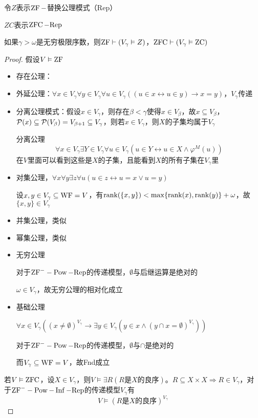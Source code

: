 \documentclass[11pt]{article}
\def \Rep {\text{Rep}}
\def \ZC {\text{ZC}}
\begin{document}
令\(Z\)表示\(\operatorname{ZF}-\)替换公理模式（Rep）

\(ZC\)表示\(\ZFC-\Rep\)

\begin{theorem}[]
如果\(\gamma>\omega\)是无穷极限序数，则\(\operatorname{ZF}\vdash(V_\gamma\vDash Z)\)，\(\ZFC\vdash(V_\gamma\vDash\ZC)\)
\end{theorem}

\begin{proof}
假设\(V\vDash\operatorname{ZF}\)
\begin{itemize}
\item 存在公理：
\item 外延公理：\(\forall x\in V_\gamma\forall y\in V_\gamma\forall u\in V_\gamma((u\in x\leftrightarrow u\in y)\to x=y)\)，\(V_\gamma\)传递
\item 分离公理模式：假设\(x\in V_\gamma\)，则存在\(\beta<\gamma\)使得\(x\in V_\beta\)，故\(x\subseteq V_\beta\)，
\(\mathcal{P}(x)\subseteq\mathcal{P}(V_\beta)=V_{\beta+1}\subseteq V_\gamma\)，则若\(x\in V_\gamma\)，则\(X\)的子集均属于\(V_\gamma\)

分离公理
\begin{equation*}
\forall x\in V_\gamma\exists Y\in V_\gamma\forall u\in V_\gamma(u\in Y\leftrightarrow u\in X\wedge\varphi^M(u))
\end{equation*}
在\(V\)里面可以看到这些是\(X\)的子集，且能看到\(X\)的所有子集在\(V_\gamma\)里
\item 对集公理，\(\forall x\forall y\exists z\forall u(u\in z\leftrightarrow u=x\vee u=y)\)

设\(x,y\in V_\gamma\subseteq\operatorname{WF}=V\)，有\(\text{rank}(\{x,y\})<\max\{\text{rank}(x),\text{rank}(y)\}+\omega\)，故\(\{x,y\}\in V_\gamma\)
\item 并集公理，类似
\item 幂集公理，类似
\item 无穷公理

对于\(\ZFm-\Pow-\Rep\)的传递模型，\(\emptyset\)与后继运算是绝对的

\(\omega\in V_\gamma\)，故无穷公理的相对化成立
\item 基础公理

\(\forall x\in V_\gamma((x\neq\emptyset)^{V_\gamma}\to\exists y\in V_\gamma(y\in x\wedge(y\cap x=\emptyset)^{V_\gamma}))\)

对于\(\ZFm-\Pow-\Rep\)的传递模型，\(\emptyset\)与\(\cap\)是绝对的

而\(V_\gamma\subseteq\operatorname{WF}=V\)，故Fnd成立
\end{itemize}



若\(V\vDash\operatorname{ZFC}\)，设\(X\in V_\gamma\)，则\(V\vDash\exists R(R\text{是$X$的良序})\)。\(R\subseteq X\times X\Rightarrow R\in V_\gamma\)，对
于\(\ZFm-\Pow-\Inf-\Rep\)的传递模型\(V_\gamma\)有
\begin{equation*}
V\vDash(R\text{是$X$的良序})^{V_\gamma}
\end{equation*}
\end{proof}
\end{document}
